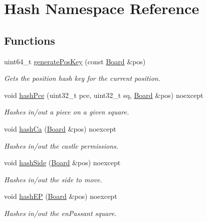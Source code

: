 \hypertarget{namespaceHash}{}\section{Hash Namespace Reference}
\label{namespaceHash}
\subsection*{Functions}
\begin{DoxyCompactItemize}
\item 
uint64\+\_\+t \mbox{\hyperlink{namespaceHash_ac97f6604fcb1ad14616b2617e6bae967}{generate\+Pos\+Key}} (const \mbox{\hyperlink{classBoard}{Board}} \&pos)
\begin{DoxyCompactList}\small\item\em Gets the position hash key for the current position. \end{DoxyCompactList}\item 
void \mbox{\hyperlink{namespaceHash_a9c05f63ef598638f821882d96e1ce185}{hash\+Pce}} (uint32\+\_\+t pce, uint32\+\_\+t sq, \mbox{\hyperlink{classBoard}{Board}} \&pos) noexcept
\begin{DoxyCompactList}\small\item\em Hashes in/out a piece on a given square. \end{DoxyCompactList}\item 
void \mbox{\hyperlink{namespaceHash_a27755caeb25c1de2a9cd390440b73f37}{hash\+Ca}} (\mbox{\hyperlink{classBoard}{Board}} \&pos) noexcept
\begin{DoxyCompactList}\small\item\em Hashes in/out the castle permissions. \end{DoxyCompactList}\item 
void \mbox{\hyperlink{namespaceHash_a3894ddfcbe25311e465ca3efcefbfe75}{hash\+Side}} (\mbox{\hyperlink{classBoard}{Board}} \&pos) noexcept
\begin{DoxyCompactList}\small\item\em Hashes in/out the side to move. \end{DoxyCompactList}\item 
void \mbox{\hyperlink{namespaceHash_a8f7a084e23934f0acade5177e1925928}{hash\+EP}} (\mbox{\hyperlink{classBoard}{Board}} \&pos) noexcept
\begin{DoxyCompactList}\small\item\em Hashes in/out the en\+Passant square. \end{DoxyCompactList}\end{DoxyCompactItemize}

